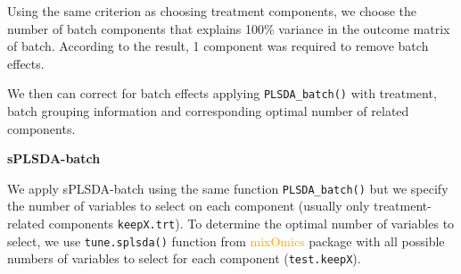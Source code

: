 \documentclass[
]{book}
\newenvironment{Shaded}{\begin{snugshade}}{\end{snugshade}}
\newcommand{\AttributeTok}[1]{\textcolor[rgb]{0.77,0.63,0.00}{#1}}
\newcommand{\CommentTok}[1]{\textcolor[rgb]{0.56,0.35,0.01}{\textit{#1}}}
\newcommand{\DecValTok}[1]{\textcolor[rgb]{0.00,0.00,0.81}{#1}}
\newcommand{\FunctionTok}[1]{\textcolor[rgb]{0.00,0.00,0.00}{#1}}
\newcommand{\NormalTok}[1]{#1}
\newcommand{\OtherTok}[1]{\textcolor[rgb]{0.56,0.35,0.01}{#1}}
\newcommand{\SpecialCharTok}[1]{\textcolor[rgb]{0.00,0.00,0.00}{#1}}
\newcommand{\StringTok}[1]{\textcolor[rgb]{0.31,0.60,0.02}{#1}}
\begin{document}
Using the same criterion as choosing treatment components, we choose the number of batch components that explains 100\% variance in the outcome matrix of batch. According to the result, 1 component was required to remove batch effects.

We then can correct for batch effects applying \texttt{PLSDA\_batch()} with treatment, batch grouping information and corresponding optimal number of related components.

\begin{Shaded}
\end{Shaded}

\textbf{sPLSDA-batch}

We apply sPLSDA-batch using the same function \texttt{PLSDA\_batch()} but we specify the number of variables to select on each component (usually only treatment-related components \texttt{keepX.trt}). To determine the optimal number of variables to select, we use \texttt{tune.splsda()} function from \textcolor{orange}{mixOmics} package \citep{rohart2017mixomics} with all possible numbers of variables to select for each component (\texttt{test.keepX}).

\begin{Shaded}
\end{Shaded}
\end{document}
